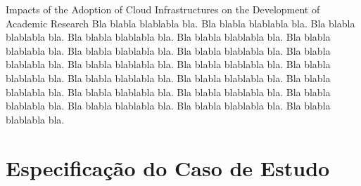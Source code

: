 \documentclass[tese,capa]{texufpel}
\begin{document}
\begin{englishabstract}{Impacts of the Adoption of Cloud Infrastructures on the Development of Academic Research}
Bla blabla blablabla bla.  Bla blabla blablabla bla.  Bla blabla
blablabla bla.  Bla blabla blablabla bla.  Bla blabla blablabla bla.
Bla blabla blablabla bla.  Bla blabla blablabla bla.  Bla blabla
blablabla bla.  Bla blabla blablabla bla.  Bla blabla blablabla bla.
Bla blabla blablabla bla.  Bla blabla blablabla bla.  Bla blabla
blablabla bla.  Bla blabla blablabla bla.  Bla blabla blablabla bla.
Bla blabla blablabla bla.  Bla blabla blablabla bla.  Bla blabla
blablabla bla.  Bla blabla blablabla bla.  Bla blabla blablabla bla.
Bla blabla blablabla bla.
\end{englishabstract}

\listoffigures

\listoftables

\chapter*{\listabbrvname}



\listoftodos %

\tableofcontents

\chapter*{Especificação do Caso de Estudo}
\end{document}
